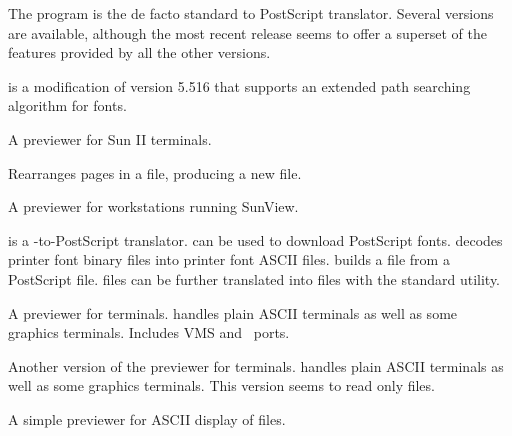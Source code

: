 
The  program is the de facto standard  to
PostScript translator.  Several versions are available, although the
most recent release seems to offer a superset of the features provided by 
all the other versions.

\newpage
{}

 is a modification of  version 5.516 that
supports an extended path searching algorithm for  fonts.


A  previewer for Sun II terminals.


Rearranges pages in a  file, producing a new  file.


A  previewer for workstations running SunView.


 is a -to-PostScript translator.  
can be used to download PostScript fonts.   decodes
printer font binary files into printer font ASCII files.  
builds a  file from a PostScript  file.   files
can be further translated into  files with the standard 
 utility.


A  previewer for terminals.   handles plain ASCII
terminals as well as some graphics terminals.  Includes VMS and \Unix\
ports.


Another version of the   previewer for
terminals.  \program{dvitovdu} handles plain ASCII terminals as well
as some graphics terminals.  This version seems to read only 
files.


A simple previewer for ASCII display of  files.


